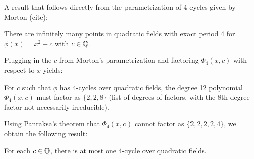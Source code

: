 A result that follows directly from the parametrization of 4-cycles given by 
Morton (cite):
\begin{theorem}
There are infinitely many points in quadratic fields with exact period 4 for
$\phi(x) = x^2 + c$ with $c \in \mathbb{Q}$.
\end{theorem}

Plugging in the $c$ from Morton's parametrization and factoring $\Phi_4(x,c)$
with respect to $x$ yields:
\begin{lemma}
For $c$ such that $\phi$ has 4-cycles over quadratic fields, the degree 12
polynomial $\Phi_4(x,c)$ must factor as $\{2,2,8\}$ (list of degrees of
factors, with the 8th degree factor not necessarily irreducible).
\end{lemma}

Using Panraksa's theorem that $\Phi_4(x,c)$ cannot factor as $\{2,2,2,2,4\}$,
we obtain the following result: 
\begin{theorem}
For each $c \in \mathbb{Q}$, there is at most one 4-cycle over quadratic fields.
\end{theorem}


